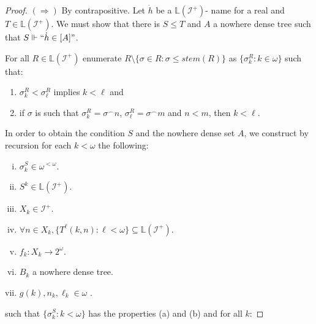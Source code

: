 \documentclass{amsart}
\theoremstyle{definition}
\theoremstyle{remark}
\numberwithin{equation}{section}
\newcommand{\li}{\mathbb{L}(\mathcal{I}^+)}
\newcommand{\id}{\mathcal{I}}
\begin{document}
\begin{proof}
$(\Rightarrow)$ By contrapositive. Let $\dot h$ be a $\li$- name for a real and $T\in \li$. We must show that there is $S\leq T$ and $A$ a nowhere dense tree such that $S\Vdash``\dot h\in [A]"$.


For all $R\in \li$ enumerate $R\setminus \{\sigma\in R:\sigma\leq stem(R)\}$ as $\{\sigma_k^R:k\in \omega\}$ such that:

\begin{enumerate}
    \item[(a)] $\sigma_k^R<\sigma_\ell^R$ implies $k<\ell$ and
    \item[(b)] if $\sigma$ is such that $\sigma_k^R=\sigma^\frown n$, $\sigma_\ell^R=\sigma^\frown m$ and $n<m$, then $k<\ell$.
\end{enumerate}

In order to obtain the condition $S$ and the nowhere dense set $A$, we construct by recursion for each $k<\omega$ the following:

\begin{enumerate}[(i)]
    \item $\sigma_k^S\in\omega^{<\omega}$.
    \item $S^k\in \li$.
    \item $X_{k}\in \id^+$.
    \item $\forall n\in X_k, \{T^{\ell}(k,n):\ell<\omega\} \subseteq \li$.
    \item $f_k:X_{k}\rightarrow2^\omega$.
    \item $B_{k}$ a nowhere dense tree.
    \item $g(k),n_k, \ell_k\in\omega$ .
\end{enumerate}


such that $\{\sigma^S_{k}:k<\omega\}$ has the properties (a) and (b) and for all $k$:


\end{proof}
\end{document}
